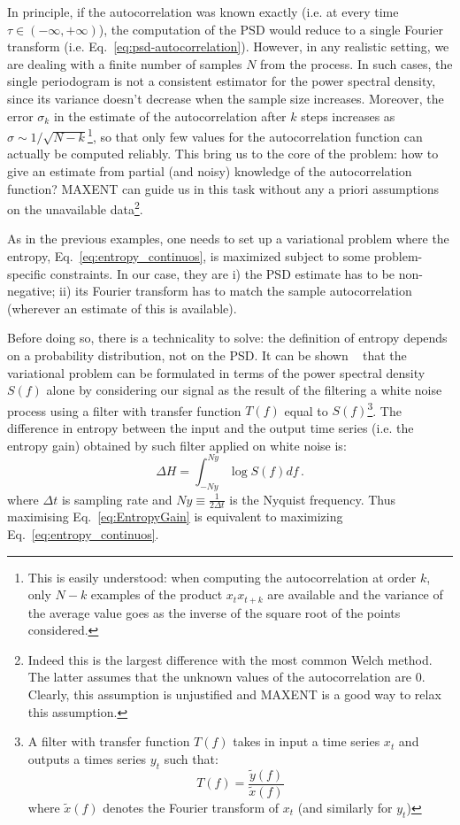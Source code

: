 \documentclass[epj,nopacs]{svjour}
\begin{document}
In principle, if the autocorrelation was known exactly (i.e. at every time $\tau \in (-\infty,+\infty)$), the computation of the PSD would reduce to a single Fourier transform (i.e. Eq.~\eqref{eq:psd-autocorrelation}). However, in any realistic setting, we are dealing with a finite number of samples $N$ from the process. In such cases, the single periodogram is not a consistent estimator for the power spectral density, since its variance doesn't decrease when the sample size increases. 
Moreover, the error $\sigma_k$ in the estimate of the autocorrelation after $k$ steps increases as $\sigma \sim 1/\sqrt{N - k}$\footnote{
This is easily understood: when computing the autocorrelation at order $k$, only $N-k$ examples of the product $x_t x_{t+k}$ are available and the variance of the average value goes as the inverse of the square root of the points considered.
}, so that only few values for the autocorrelation function can actually be computed reliably.
This bring us to the core of the problem: how to give an estimate from partial (and noisy) knowledge of the autocorrelation function? MAXENT can guide us in this task without any a priori assumptions on the unavailable data\footnote{Indeed this is the largest difference with the most common Welch method. The latter assumes that the unknown values of the autocorrelation are $0$. Clearly, this assumption is unjustified and MAXENT is a good way to relax this assumption.}.

As in the previous examples, one needs to set up a variational problem where the entropy, Eq.~\eqref{eq:entropy_continuos}, is maximized 
subject to some problem-specific constraints. In our case, they are i) the PSD estimate has to be non-negative; ii) its Fourier transform has to match the sample autocorrelation (wherever an estimate of this is available).

Before doing so, there is a technicality to solve: the definition of entropy depends on a probability distribution, not on the PSD.
It can be shown ~\cite[e.g.]{AblesMESA,Bartlett} that the variational problem can be formulated in terms of the power spectral density $S(f)$ alone by considering our signal as the result of the filtering a white noise process using a filter with transfer function $T(f)$ equal to $S(f)$\footnote{
A filter with transfer function $T(f)$ takes in input a time series $x_t$ and outputs a times series $y_t$ such that:
$$T(f) = \frac{\tilde{y}(f)}{\tilde{x}(f)}$$
where $\tilde{x}(f)$ denotes the Fourier transform of $x_t$ (and similarly for $y_t$)
}.
The difference in entropy between the input and the output time series (i.e. the entropy gain) obtained by such filter applied on white noise is:
\begin{equation}\label{eq:EntropyGain}
    \Delta H = \int_{- Ny}^{Ny}\log S(f) df\,.
\end{equation}
where $\Delta t$ is sampling rate and $Ny \equiv \frac{1}{2 \Delta t}$  is the Nyquist frequency.
Thus maximising Eq.~\eqref{eq:EntropyGain} is equivalent to maximizing Eq.~\eqref{eq:entropy_continuos}.
\end{document}
